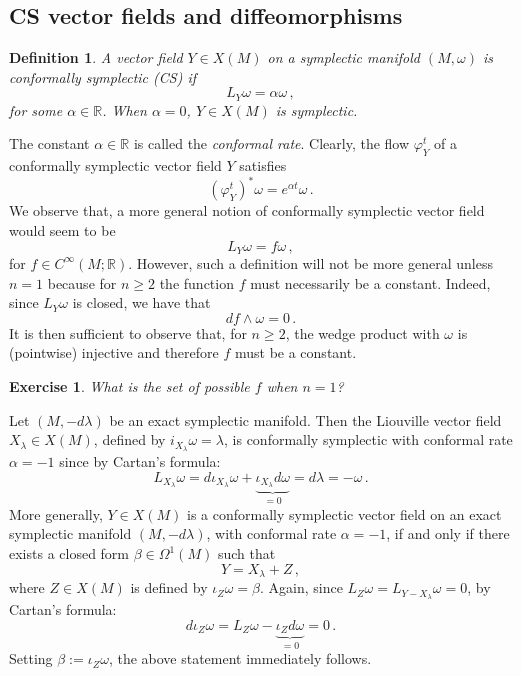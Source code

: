 \documentclass{article}
\newcommand{\1}{\mathbbm{1}}
\newtheorem{defn}[thm]{Definition}
\newtheorem{exo}{Exercise}
\theoremstyle{remark}
\begin{document}
\subsection{CS vector fields and diffeomorphisms}
\begin{defn}
A vector field $Y \in X(M)$ on a symplectic manifold $(M,\omega)$ is conformally symplectic (CS) if 
\begin{equation} \label{CS}
L_Y\omega = \alpha \omega\, ,
\end{equation}
for some $\alpha \in \mathbb{R}$. When $\alpha = 0$, $Y \in X(M)$ is symplectic.
\end{defn}
\noindent The constant $\alpha \in \mathbb{R}$ is called the \textit{conformal rate}. Clearly, the flow $\varphi_Y^t$ of a conformally symplectic vector field $Y$ satisfies
\begin{equation} \label{CSflow}
(\varphi_Y^t)^* \omega = e^{\alpha t} \omega\, .
\end{equation}
We observe that, a more general notion of conformally symplectic vector field would seem to be
$$L_Y \omega = f \omega\, ,$$
for $f \in C^{\infty}(M;\mathbb{R})$. However, such a definition will not be more general unless $n = 1$ because for $n \geq 2$ the function $f$ must necessarily be a constant. Indeed, since $L_Y\omega$ is closed, we have that
$$df \wedge \omega = 0\, .$$
It is then sufficient to observe that, for $n \ge 2$, the wedge product with $\omega$ is (pointwise) injective and therefore $f$ must be a constant. 
\begin{exo}
\textnormal{What is the set of possible $f$ when $n=1$?}
\end{exo}
\noindent Let $(M,-d\lambda)$ be an exact symplectic manifold. Then the Liouville vector field $X_\lambda \in X(M)$, defined by $i_{X_\lambda}\omega = \lambda$, is conformally symplectic with conformal rate $\alpha = -1$ since by Cartan's formula: 
$$L_{X_\lambda} \omega = d \iota_{X_\lambda} \omega + \underbrace{\iota_{X_\lambda} d \omega}_{=0}  = d\lambda = -\omega\, .$$
More generally, $Y \in X(M)$ is a conformally symplectic vector field on an exact symplectic manifold $(M,-d\lambda)$, with conformal rate $\alpha = -1$, if and only if there exists a closed form $\beta \in \Omega^1(M)$ such that
$$Y = X_\lambda + Z\, ,$$
where $Z \in X(M)$ is defined by $\iota_{Z}\omega = \beta$. Again, since $L_{Z}\omega = L_{Y - X_{\lambda}} \omega = 0$, by Cartan's formula:
$$d\iota_Z \omega = L_Z \omega - \underbrace{\iota_{Z} d \omega}_{=0} = 0\, .$$
Setting $\beta := \iota_Z \omega$, the above statement immediately follows.
\end{document}

